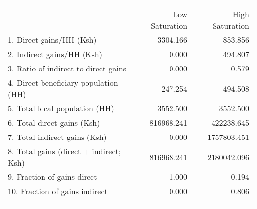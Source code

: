\begin{tabular}{lrr}
\\[-1.8ex]\hline 
 \hline \\[-1.8ex]
 & Low Saturation & High Saturation \\
\midrule
1. Direct gains/HH (Ksh) & 3304.166 & 853.856 \\
2. Indirect gains/HH (Ksh) & 0.000 & 494.807 \\
3. Ratio of indirect to direct gains & 0.000 & 0.579 \\
4. Direct beneficiary population (HH) & 247.254 & 494.508 \\
5. Total local population (HH) & 3552.500 & 3552.500 \\
6. Total direct gains (Ksh) & 816968.241 & 422238.645 \\
7. Total indirect gains (Ksh) & 0.000 & 1757803.451 \\
8. Total gains (direct + indirect; Ksh) & 816968.241 & 2180042.096 \\
9. Fraction of gains direct & 1.000 & 0.194 \\
10. Fraction of gains indirect & 0.000 & 0.806 \\
\\[-1.8ex]\hline 
 \hline \\[-1.8ex]
\end{tabular}
